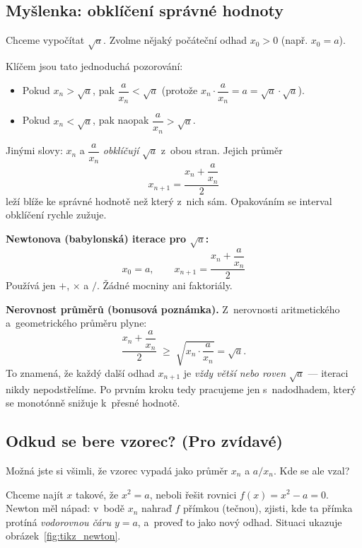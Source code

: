 \documentclass[12pt, a4paper]{article}
\begin{document}
\subsection{Myšlenka: obklíčení správné hodnoty}

Chceme vypočítat $\sqrt{a}$.
Zvolme nějaký počáteční odhad $x_0 > 0$ (např. $x_0 = a$).

Klíčem jsou tato jednoduchá pozorování:

\begin{itemize}
    \item Pokud $x_n > \sqrt{a}$, pak $\dfrac{a}{x_n} < \sqrt{a}$
          (protože $x_n \cdot \dfrac{a}{x_n} = a = \sqrt{a} \cdot \sqrt{a}$).
    \item Pokud $x_n < \sqrt{a}$, pak naopak $\dfrac{a}{x_n} > \sqrt{a}$.
\end{itemize}

Jinými slovy: $x_n$ a $\dfrac{a}{x_n}$ \emph{obklíčují} $\sqrt{a}$
z~obou stran. Jejich průměr
\[
    x_{n+1} = \frac{x_n + \dfrac{a}{x_n}}{2}
\]
leží blíže ke správné hodnotě než který z~nich sám.
Opakováním se interval obklíčení rychle zužuje.

\begin{defbox}
\textbf{Newtonova (babylonská) iterace pro $\sqrt{a}$:}
\[
    x_0 = a, \qquad
    x_{n+1} = \frac{x_n + \dfrac{a}{x_n}}{2}
\]
Používá jen $+$, $\times$ a $/$. Žádné mocniny ani faktoriály.
\end{defbox}

\begin{notebox}
\textbf{Nerovnost průměrů (bonusová poznámka).}
Z~nerovnosti aritmetického a~geometrického průměru plyne:
\[
    \frac{x_n + \dfrac{a}{x_n}}{2}
    \;\geq\; \sqrt{x_n \cdot \frac{a}{x_n}}
    = \sqrt{a}.
\]
To znamená, že každý další odhad $x_{n+1}$ je \emph{vždy větší nebo roven}
$\sqrt{a}$ --- iteraci nikdy nepodstřelíme.
Po prvním kroku tedy pracujeme jen s~nadodhadem,
který se monotónně snižuje k~přesné hodnotě.
\end{notebox}

\subsection{Odkud se bere vzorec? (Pro zvídavé)}

Možná jste si všimli, že vzorec vypadá jako průměr $x_n$ a $a/x_n$.
Kde se ale vzal?

Chceme najít $x$ takové, že $x^2 = a$, neboli řešit rovnici
$f(x) = x^2 - a = 0$.
Newton měl nápad: v~bodě $x_n$ nahraď $f$ přímkou (tečnou),
zjisti, kde ta přímka protíná \emph{vodorovnou čáru $y = a$},
a~proveď to jako nový odhad. Situaci ukazuje obrázek~\ref{fig:tikz_newton}.
\end{document}
